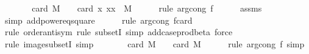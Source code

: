 \begin{isabellebody}
\ \ \isamarkupfalse%
\ \isamarkupfalse%
\ {\isachardoublequoteopen}{\isachardot}{\kern0pt}{\isachardot}{\kern0pt}{\isachardot}{\kern0pt}\ {\isacharequal}{\kern0pt}\ card\ M\ {\isacharcircum}{\kern0pt}\ {}\ {\isacharminus}{\kern0pt}\ card\ {\isacharparenleft}{\kern0pt}{\isacharparenleft}{\kern0pt}{\isasymlambda}x{\isachardot}{\kern0pt}\ {\isacharparenleft}{\kern0pt}x{\isacharcomma}{\kern0pt}x{\isacharparenright}{\kern0pt}{\isacharparenright}{\kern0pt}\ {\isacharbackquote}{\kern0pt}\ M{\isacharparenright}{\kern0pt}{\isachardoublequoteclose}\isanewline
\ \ \ \ \isamarkupfalse%
\ {\isacharparenleft}{\kern0pt}rule\ arg{\isacharunderscore}{\kern0pt}cong{}{\isacharbrackleft}{\kern0pt}\ f{\isacharequal}{\kern0pt}{\isachardoublequoteopen}{\isacharparenleft}{\kern0pt}{\isacharminus}{\kern0pt}{\isacharparenright}{\kern0pt}{\isachardoublequoteclose}{\isacharbrackright}{\kern0pt}{\isacharparenright}{\kern0pt}\isanewline
\ \ \ \ \isamarkupfalse%
\ assms\ \isamarkupfalse%
\ {\isacharparenleft}{\kern0pt}simp\ add{\isacharcolon}{\kern0pt}power{}{\isacharunderscore}{\kern0pt}eq{\isacharunderscore}{\kern0pt}square{\isacharparenright}{\kern0pt}\isanewline
\ \ \ \ \isamarkupfalse%
\ {\isacharparenleft}{\kern0pt}rule\ arg{\isacharunderscore}{\kern0pt}cong{\isacharbrackleft}{\kern0pt}\ f{\isacharequal}{\kern0pt}{\isachardoublequoteopen}card{\isachardoublequoteclose}{\isacharbrackright}{\kern0pt}{\isacharparenright}{\kern0pt}\isanewline
\ \ \ \ \isamarkupfalse%
\ {\isacharparenleft}{\kern0pt}rule\ order{\isacharunderscore}{\kern0pt}antisym{\isacharcomma}{\kern0pt}\ rule\ subsetI{\isacharcomma}{\kern0pt}\ simp\ add{\isacharcolon}{\kern0pt}case{\isacharunderscore}{\kern0pt}prod{\isacharunderscore}{\kern0pt}beta{\isacharcomma}{\kern0pt}\ force{\isacharparenright}{\kern0pt}\isanewline
\ \ \ \ \isamarkupfalse%
\ {\isacharparenleft}{\kern0pt}rule\ image{\isacharunderscore}{\kern0pt}subsetI{\isacharcomma}{\kern0pt}\ simp{\isacharparenright}{\kern0pt}\isanewline
\ \ \isamarkupfalse%
\ \isamarkupfalse%
\ {\isachardoublequoteopen}{\isachardot}{\kern0pt}{\isachardot}{\kern0pt}{\isachardot}{\kern0pt}\ {\isacharequal}{\kern0pt}\ card\ M\ {\isacharcircum}{\kern0pt}\ {}\ {\isacharminus}{\kern0pt}\ card\ M{\isachardoublequoteclose}\isanewline
\ \ \ \ \isamarkupfalse%
\ {\isacharparenleft}{\kern0pt}rule\ arg{\isacharunderscore}{\kern0pt}cong{}{\isacharbrackleft}{\kern0pt}\ f{\isacharequal}{\kern0pt}{\isachardoublequoteopen}{\isacharparenleft}{\kern0pt}{\isacharminus}{\kern0pt}{\isacharparenright}{\kern0pt}{\isachardoublequoteclose}{\isacharbrackright}{\kern0pt}{\isacharcomma}{\kern0pt}\ simp{\isacharparenright}{\kern0pt}\isanewline

\end{isabellebody}
